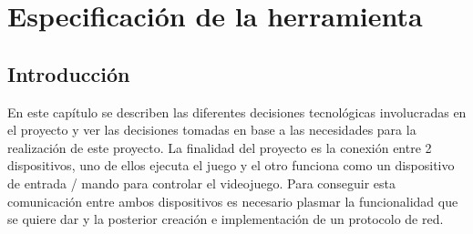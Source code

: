 %
%
%
%
%
%
%
%
%
%


\begin{FraseCelebre}
\begin{Frase}
\end{Frase}
\begin{Fuente}
\end{Fuente}
\end{FraseCelebre}


\chapter{Especificaci\'on de la herramienta}
\label{cap3}
\label{cap:especificacion}

\section{Introducci\'on}
\label{cap3:sec:intro}
En este cap\'itulo se describen las diferentes decisiones tecnol\'ogicas involucradas en el proyecto y ver las decisiones tomadas en base a las necesidades para la realizaci\'on de este proyecto. La finalidad del proyecto es la conexi\'on entre 2 dispositivos, uno de ellos ejecuta el juego y el otro funciona como un dispositivo de entrada / mando para controlar el videojuego. 
Para conseguir esta comunicaci\'on entre ambos dispositivos es necesario plasmar la funcionalidad que se quiere dar y la posterior creaci\'on e implementaci\'on de un protocolo de red.


